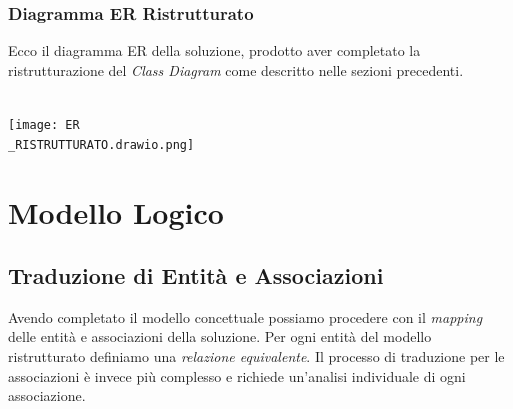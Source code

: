 \documentclass{article}
\begin{document}
	
	\subsubsection{Diagramma ER Ristrutturato}
	Ecco il diagramma ER della soluzione, prodotto aver completato la ristrutturazione del \textit{Class Diagram} come descritto nelle sezioni precedenti.
	\\\\
	
	\begin{center}
		\texttt{[image: ER\\\_RISTRUTTURATO.drawio.png]}
	\end{center}
	
	
	\newpage
	
	
	\section{Modello Logico}
	
	\subsection{Traduzione di Entit\`a e Associazioni}
	Avendo completato il modello concettuale possiamo procedere con il \textit{mapping} delle entit\`a e associazioni della soluzione. Per ogni entit\`a del modello ristrutturato definiamo una \textit{relazione equivalente}. Il processo di traduzione per le associazioni \`e invece pi\`u complesso e richiede un’analisi individuale di ogni associazione.
	
\end{document}
